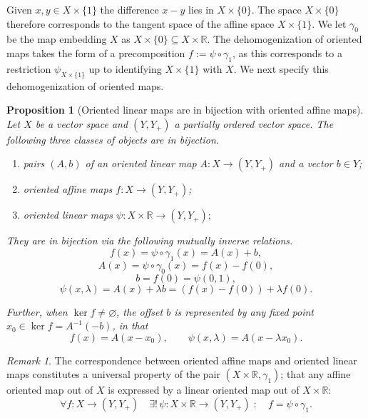 \documentclass{article}
\theoremstyle{plain}
\newtheorem{proposition}[proposition]{Proposition}
\theoremstyle{definition}
\theoremstyle{remark}
\newtheorem{remark}[remark]{Remark}
\begin{document}
Given $x, y \in X \times \{1\}$ the difference $x-y$ lies in $X \times \{0\}$.
The space $X \times \{0\}$ therefore corresponds to the tangent space
of the affine space $X \times \{1\}$. We let $\gamma_0$ be the map embedding $X$
as $X \times \{0\} \subseteq X \times \mathbb{R}$.
The dehomogenization of oriented maps takes the form of a precomposition $f := \psi \circ \gamma_1$, as this corresponds to a restriction $\psi_{X  \times \{ 1 \}}$
up to identifying $X  \times \{ 1 \}$ with $X$.
We next specify this dehomogenization of oriented maps.
\begin{proposition}[Oriented linear maps are in bijection with oriented affine maps]
\label{loc:oriented_linear_maps_are_in_bijection_with_oriented_affine_maps.statement}
Let $X$ be a vector space and $(Y, Y_+)$ a partially ordered vector space.
The following three classes of objects are in bijection.
\begin{enumerate}
\item pairs $(A, b)$ of an oriented linear map $A: X \to (Y, Y_+)$ and a vector $b \in Y$;
\item oriented affine maps $f: X \to (Y, Y_+)$;
\item oriented linear maps $\psi: X \times \mathbb{R} \to (Y, Y_+);$
\end{enumerate}

They are in bijection via the following mutually inverse relations.
\begin{equation*}
f(x) = \psi \circ \gamma_1(x)= A(x) + b,
\end{equation*}
\begin{equation*}
A(x) = \psi \circ \gamma_0(x) = f(x) - f(0) ,
\end{equation*}
\begin{equation*}
b = f(0) = \psi(0, 1),
\end{equation*}
\begin{equation*}
\psi(x, \lambda) = A(x) + \lambda b = (f(x) - f(0)) + \lambda f(0).
\end{equation*}

Further, when $\ker f \neq \varnothing$, the offset $b$ is represented by any
fixed point $x_0 \in \ker f = A^{-1}(-b)$, in that
\begin{equation*}
f(x) = A(x - x_0), \qquad \psi(x, \lambda) = A(x - \lambda x_0).
\end{equation*}
\end{proposition}
\begin{remark}

The correspondence between oriented affine maps and
oriented linear maps constitutes a universal property of the
pair $(X \times \mathbb{R}, \gamma_1)$; that any affine oriented map out of $X$ is
expressed by a linear oriented map out of $X \times \mathbb{R}$:
\begin{equation*}
\forall f:X \to (Y,Y_+) \quad  \exists!\, \psi: X \times \mathbb{R} \to (Y, Y_+) \; : \quad f =
\psi \circ \gamma_1.
\end{equation*}
\end{remark}
\end{document}
